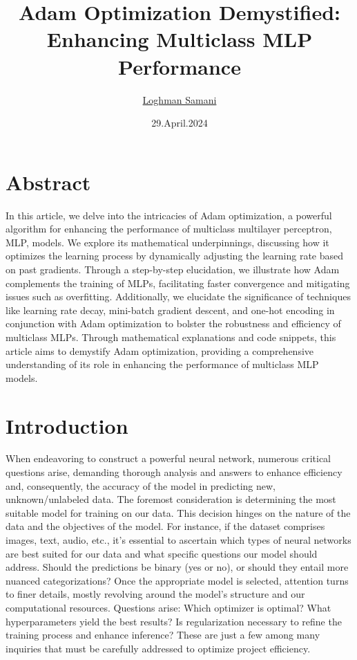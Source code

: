 \documentclass[12pt]{article}
\begin{document}
\title{\textbf{\LARGE Adam Optimization Demystified: Enhancing Multiclass MLP Performance}}
\author{\href{samaniloqman91@gmail.com}{Loghman Samani}}
\date{29.April.2024} %
\maketitle

\section*{\large Abstract}
In this article, we delve into the intricacies of Adam optimization, a powerful algorithm for enhancing the performance of multiclass multilayer perceptron, MLP, models. We explore its mathematical underpinnings, discussing how it optimizes the learning process by dynamically adjusting the learning rate based on past gradients. Through a step-by-step elucidation, we illustrate how Adam complements the training of MLPs, facilitating faster convergence and mitigating issues such as overfitting. Additionally, we elucidate the significance of techniques like learning rate decay, mini-batch gradient descent, and one-hot encoding in conjunction with Adam optimization to bolster the robustness and efficiency of multiclass MLPs. Through mathematical explanations and code snippets, this article aims to demystify Adam optimization, providing a comprehensive understanding of its role in enhancing the performance of multiclass MLP models.

\section*{\large Introduction}

When endeavoring to construct a powerful neural network, numerous critical questions arise, demanding thorough analysis and answers to enhance efficiency and, consequently, the accuracy of the model in predicting new, unknown/unlabeled data. The foremost consideration is determining the most suitable model for training on our data. This decision hinges on the nature of the data and the objectives of the model. For instance, if the dataset comprises images, text, audio, etc., it's essential to ascertain which types of neural networks are best suited for our data and what specific questions our model should address. Should the predictions be binary (yes or no), or should they entail more nuanced categorizations? Once the appropriate model is selected, attention turns to finer details, mostly revolving around the model's structure and our computational resources. Questions arise: Which optimizer is optimal? What hyperparameters yield the best results? Is regularization necessary to refine the training process and enhance inference? These are just a few among many inquiries that must be carefully addressed to optimize project efficiency.\\[6px]
\end{document}
